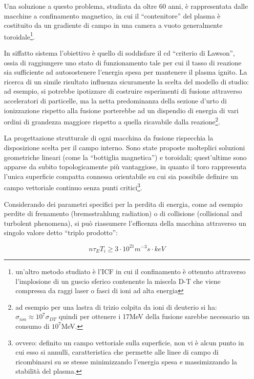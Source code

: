 Una soluzione a questo problema, studiata da oltre 60 anni, è
rappresentata dalle macchine a confinamento magnetico, in cui il
``contenitore'' del plasma è costituito da un gradiente di campo in una
camera a vuoto generalmente toroidale\footnote{un'altro metodo studiato
è l'ICF in cui il confinamento è ottenuto attraverso l'implosione di un
guscio sferico contenente la miscela D-T che viene compressa da raggi
laser o fasci di ioni ad alta energia}.

In siffatto sistema l'obiettivo è quello di soddisfare il cd ``criterio
di Lawson'', ossia di raggiungere uno stato di funzionamento tale per
cui il tasso di reazione sia sufficiente ad autosostenere l'energia
spesa per mantenere il plasma ignito.  La ricerca di un simile risultato
influenza sicuramente la scelta del modello di studio: ad esempio, si
potrebbe ipotizzare di costruire esperimenti di fusione attraverso
acceleratori di particelle, ma la netta predominanza della sezione
d'urto di ionizzazione rispetto alla fusione porterebbe ad un dispendio
di energia di vari ordini di grandezza maggiore rispetto a quella
ricavabile dalla reazione\footnote{ad esempio per una lastra di trizio
colpita da ioni di deuterio si ha: $\sigma_{ion} \approx 10^7
\sigma_{DT}$ quindi per ottenere i 17MeV della fusione sarebbe
necessario un consumo di $10^7$MeV.}.

La progettazione strutturale di ogni macchina da fusione rispecchia la
disposizione scelta per il campo interno. Sono state proposte molteplici
soluzioni geometriche lineari (come la ``bottiglia magnetica'') e
toroidali; quest'ultime sono apparse da subito topologicamente più
vantaggiose, in quanto il toro rappresenta l'unica superficie compatta
connessa orientabile su cui sia possibile definire un campo vettoriale
continuo senza punti critici\footnote{ovvero: definito un campo
vettoriale sulla superficie, non vi è alcun punto in cui esso si
annulli, caratteristica che permette alle linee di campo di ricombinarsi
su se stesse minimizzando l'energia spesa e massimizzando la stabilità
del plasma.}.

Considerando dei parametri specifici per la perdita di energia, come ad
 esempio perdite di frenamento (bremsstrahlung radiation) o di
 collisione (collisional and turbolent phenomena), si può riassumere
 l'efficenza della macchina attraverso un singolo valore detto ``triplo
 prodotto''\cite{cecco}:

\begin{equation}
 n \tau_E T_i \geq 3 \cdot 10^{21} m^{-3}s \cdot keV
\end{equation}

